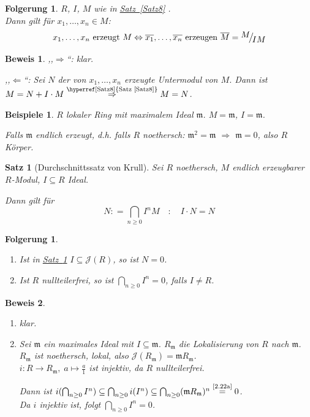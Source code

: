 \documentclass[a4paper,12pt]{scrbook}
\theoremstyle{break}
\newtheorem{Satz}{Satz}
\newtheorem{Folg}[Def]{Folgerung}
\theoremstyle{nonumberbreak}
\newtheorem{Bew}{Beweis}
\newtheorem{nnBsp}{Beispiele}
\theoremstyle{nonumberplain}
\newcommand{\defeqr}[0]{\mathrel{\mathop:}=}
\newcommand{\myref}[2]{%
\hyperref[#2]{#1~\ref*{#2}}%
}
\newcommand{\FakRaum}[2]{
  \raisebox{0.7ex}{\ensuremath{#1}}
  \ensuremath{\mkern-3mu}\big/\ensuremath{\mkern-3mu}
  \raisebox{-0.6ex}{\ensuremath{#2}}}
\begin{document}
\begin{Folg}
\label{2.21}
  $R$, $I$, $M$ wie in \myref{Satz}{Satz8}.\\
  Dann gilt für $x_1, \dots, x_n \in M$:
  \[ x_1, \dots, x_n \text{ erzeugt } M \Leftrightarrow \overline{x_1}, \dots, \overline{x_n} \text{ erzeugen } \overline{M} = \FakRaum{M}{IM} \]
\end{Folg}

\begin{Bew}
  ,,$\Rightarrow$``: klar.

  ,,$\Leftarrow$``: Sei $N$ der von $x_1, \dots, x_n$ erzeugte Untermodul von $M$. Dann ist $M = N + I \cdot M \overset{\text{\myref{Satz}{Satz8}}}{\Rightarrow} M = N$.
\end{Bew}

\begin{nnBsp}
  $R$ lokaler Ring mit maximalem Ideal $\mathfrak{m}$.
  $M = \mathfrak{m}$, $I = \mathfrak{m}$.

  Falls $\mathfrak{m}$ endlich erzeugt, d.h. falls $R$ noethersch:
  $\mathfrak{m}^2 = \mathfrak{m}$ $\Rightarrow$ $\mathfrak{m} = 0$, also $R$ Körper.
\end{nnBsp}

\begin{Satz}[Durchschnittssatz von Krull]
\label{Satz9}
  Sei $R$ noethersch, $M$ endlich erzeugbarer $R$-Modul, $I \subseteq R$ Ideal.

  Dann gilt für $$N \defeqr \bigcap_{n \geq 0} I^n M \quad : \quad I \cdot N = N$$
\end{Satz}

\begin{Folg}\label{2.22}
  \begin{enumerate}
    \item \label{2.22a} Ist in \myref{Satz}{Satz9} $I \subseteq \mathcal{J}(R)$, so ist $N = 0$.
    \item Ist $R$ nullteilerfrei, so ist $\bigcap_{n \geq 0} I^n = 0$, falls $I \neq R$.
  \end{enumerate}
\end{Folg}

\begin{Bew}
  \begin{enumerate}
    \item klar.
    \item Sei $\mathfrak{m}$ ein maximales Ideal mit $I \subseteq \mathfrak{m}$.
    $R_{\mathfrak{m}}$ die Lokalisierung von $R$ nach $\mathfrak{m}$.\\
    $R_{\mathfrak{m}}$ ist noethersch, lokal, also $\mathcal{J}(R_{\mathfrak{m}}) = \mathfrak{m} R_{\mathfrak{m}}$.\\
    $i: R \to R_{\mathfrak{m}}, \; a \mapsto \frac{a}{1}$ ist injektiv, da $R$ nullteilerfrei.

    Dann ist $i(\bigcap_{n \geq 0} I^n) \subseteq \bigcap_{n \geq 0} i(I^n) \subseteq \bigcap_{n \geq 0}(\mathfrak{m} R_{\mathfrak{m}})^n \overset{\text{\ref{2.22a}}}{=} 0$.\\
    Da $i$ injektiv ist, folgt $\bigcap_{n \geq 0} I^n = 0$.
  \end{enumerate}
\end{Bew}
\end{document}
